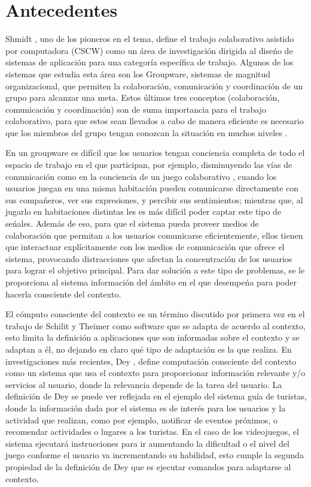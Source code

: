\section{Antecedentes}
Shmidt \cite{schmidt1992taking}, uno de los pioneros en el tema, define el trabajo colaborativo asistido por computadora (CSCW) como un \'area de investigaci\'on dirigida al dise\'no de sistemas de aplicaci\'on para una categor\'ia espec\'ifica de trabajo. Algunos de los sistemas que estudia esta \'area son los Groupware, sistemas de magnitud organizacional, que permiten la colaboraci\'on, comunicaci\'on y coordinaci\'on de un grupo para alcanzar una meta. Estos \'ultimos tres conceptos (colaboraci\'on, comunicaci\'on y coordinaci\'on) son de suma importancia para el trabajo colaborativo, para que estos sean llevados a cabo de manera eficiente es necesario que los miembros del grupo tengan conozcan la situaci\'on en muchos niveles \cite{gutwin1996supporting}. 

En un groupware es dif\'icil que los usuarios tengan conciencia completa de todo el espacio de trabajo en el que participan, por ejemplo, disminuyendo las v\'ias de comunicaci\'on como  en la conciencia de un juego colaborativo \cite{montane2013context}, cuando los usuarios juegan en una misma habitaci\'on pueden comunicarse directamente con sus compa\'neros, ver sus expresiones, y percibir sus sentimientos; mientras que, al jugarlo en habitaciones distintas les es m\'as dif\'icil poder captar este tipo de se\'nales. Adem\'as de eso, para que el sistema pueda proveer medios de colaboraci\'on que permitan a los usuarios comunicarse eficientemente, ellos tienen que interactuar expl\'icitamente con los medios de comunicaci\'on que ofrece el sistema, provocando distracciones que afectan la concentraci\'on de los usuarios para lograr el objetivo principal. Para dar soluci\'on a este tipo de problemas, se le proporciona al sistema informaci\'on del \'ambito en el que desempe\'na para poder hacerla consciente del contexto.
 
El c\'omputo consciente del contexto es un t\'ermino discutido por primera vez en el trabajo de Schilit y Theimer \cite{schillit1994disseminating} como software que se adapta de acuerdo al contexto, esto limita la definici\'on a aplicaciones que son informadas sobre el contexto y se adaptan a \'el, no dejando en claro qu\'e tipo de adaptaci\'on es la que realiza. En investigaciones m\'as recientes, Dey \cite{dey2001conceptual}, define computaci\'on consciente del contexto como un sistema que usa el contexto para proporcionar informaci\'on relevante y/o servicios al usuario, donde la relevancia depende de la tarea del usuario. La definici\'on de Dey se puede ver reflejada en el ejemplo del sistema gu\'ia de turistas, donde la informaci\'on dada por el sistema es de inter\'es para los usuarios y la actividad que realizan, como por ejemplo, notificar de eventos pr\'oximos, o recomendar actividades o lugares a los turistas. En el caso de los videojuegos, el sistema ejecutar\'a instrucciones para ir aumentando la dificultad o el nivel del juego conforme el usuario va incrementando su habilidad, esto cumple la segunda propiedad de la definici\'on de Dey que es ejecutar comandos para adaptarse al contexto.

